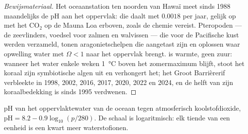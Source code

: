 \begin{proof}[Bewijsmateriaal]
Het oceaanstation ten noorden van Hawaï meet sinds 1988 maandelijks de pH aan
het oppervlak: die daalt met $0.0018$ per jaar, gelijk op met het
\ensuremath{\mathrm{CO_2}} op de Mauna Loa erboven, zoals de chemie vereist.
Pteropoden --- de zeevlinders, voedsel voor zalmen en walvissen --- die voor de
Pacifische kust werden verzameld, tonen aragonietschelpen die
aangetast zijn en oplossen waar opwelling water met $\Omega <
1$ naar het oppervlak brengt.  is warmte, geen zuur: wanneer het
water enkele weken \qty{1}{\celsius} boven het zomermaximum blijft, stoot het
koraal zijn symbiotische algen uit en verhongert het; het Groot
Barrièrerif verbleekte in 1998, 2002, 2016, 2017, 2020, 2022 en 2024,
en de helft van zijn koraalbedekking is sinds 1995 verdwenen.
\end{proof}

\begin{omfigure}

{\small pH van het oppervlaktewater van de oceaan tegen atmosferisch
koolstofdioxide, $\mathrm{pH} = 8.2 - 0.9\log_{10}(p/280)$. De schaal is
logaritmisch: elk tiende van een eenheid is een kwart meer
waterstofionen.}
\end{omfigure}

